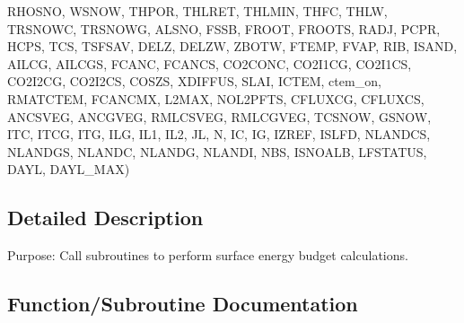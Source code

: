 \begin{DoxyCompactItemize}
R\+H\+O\+S\+N\+O, W\+S\+N\+O\+W, T\+H\+P\+O\+R, T\+H\+L\+R\+E\+T, T\+H\+L\+M\+I\+N, T\+H\+F\+C, T\+H\+L\+W, T\+R\+S\+N\+O\+W\+C, T\+R\+S\+N\+O\+W\+G, A\+L\+S\+N\+O, F\+S\+S\+B, F\+R\+O\+O\+T, F\+R\+O\+O\+T\+S, R\+A\+D\+J, P\+C\+P\+R, H\+C\+P\+S, T\+C\+S, T\+S\+F\+S\+A\+V, D\+E\+L\+Z, D\+E\+L\+Z\+W, Z\+B\+O\+T\+W, F\+T\+E\+M\+P, F\+V\+A\+P, R\+I\+B, I\+S\+A\+N\+D, A\+I\+L\+C\+G, A\+I\+L\+C\+G\+S, F\+C\+A\+N\+C, F\+C\+A\+N\+C\+S, C\+O2\+C\+O\+N\+C, C\+O2\+I1\+C\+G, C\+O2\+I1\+C\+S, C\+O2\+I2\+C\+G, C\+O2\+I2\+C\+S, C\+O\+S\+Z\+S, X\+D\+I\+F\+F\+U\+S, S\+L\+A\+I, I\+C\+T\+E\+M, ctem\+\_\+on, R\+M\+A\+T\+C\+T\+E\+M, F\+C\+A\+N\+C\+M\+X, L2\+M\+A\+X, N\+O\+L2\+P\+F\+T\+S, C\+F\+L\+U\+X\+C\+G, C\+F\+L\+U\+X\+C\+S, A\+N\+C\+S\+V\+E\+G, A\+N\+C\+G\+V\+E\+G, R\+M\+L\+C\+S\+V\+E\+G, R\+M\+L\+C\+G\+V\+E\+G, T\+C\+S\+N\+O\+W, G\+S\+N\+O\+W, I\+T\+C, I\+T\+C\+G, I\+T\+G, I\+L\+G, I\+L1, I\+L2, J\+L, N, I\+C, I\+G, I\+Z\+R\+E\+F, I\+S\+L\+F\+D, N\+L\+A\+N\+D\+C\+S, N\+L\+A\+N\+D\+G\+S, N\+L\+A\+N\+D\+C, N\+L\+A\+N\+D\+G, N\+L\+A\+N\+D\+I, N\+B\+S, I\+S\+N\+O\+A\+L\+B, L\+F\+S\+T\+A\+T\+U\+S, D\+A\+Y\+L, D\+A\+Y\+L\+\_\+\+M\+A\+X)
\end{DoxyCompactItemize}


\subsection{Detailed Description}
Purpose\+: Call subroutines to perform surface energy budget calculations. 



\subsection{Function/\+Subroutine Documentation}
\hypertarget{CLASST_8f_a676b19c50cb1465a40c967d75168a72f}{}
